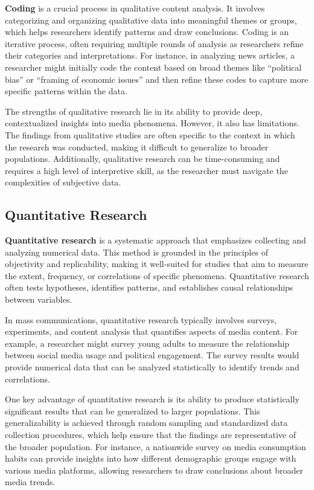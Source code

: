\documentclass[
]{book}
\begin{document}
\textbf{Coding} is a crucial process in qualitative content analysis. It involves categorizing and organizing qualitative data into meaningful themes or groups, which helps researchers identify patterns and draw conclusions. Coding is an iterative process, often requiring multiple rounds of analysis as researchers refine their categories and interpretations. For instance, in analyzing news articles, a researcher might initially code the content based on broad themes like ``political bias'' or ``framing of economic issues'' and then refine these codes to capture more specific patterns within the data.

The strengths of qualitative research lie in its ability to provide deep, contextualized insights into media phenomena. However, it also has limitations. The findings from qualitative studies are often specific to the context in which the research was conducted, making it difficult to generalize to broader populations. Additionally, qualitative research can be time-consuming and requires a high level of interpretive skill, as the researcher must navigate the complexities of subjective data.

\subsection*{Quantitative Research}\label{quantitative-research}

\textbf{Quantitative research} is a systematic approach that emphasizes collecting and analyzing numerical data. This method is grounded in the principles of objectivity and replicability, making it well-suited for studies that aim to measure the extent, frequency, or correlations of specific phenomena. Quantitative research often tests hypotheses, identifies patterns, and establishes causal relationships between variables.

In mass communications, quantitative research typically involves surveys, experiments, and content analysis that quantifies aspects of media content. For example, a researcher might survey young adults to measure the relationship between social media usage and political engagement. The survey results would provide numerical data that can be analyzed statistically to identify trends and correlations.

One key advantage of quantitative research is its ability to produce statistically significant results that can be generalized to larger populations. This generalizability is achieved through random sampling and standardized data collection procedures, which help ensure that the findings are representative of the broader population. For instance, a nationwide survey on media consumption habits can provide insights into how different demographic groups engage with various media platforms, allowing researchers to draw conclusions about broader media trends.
\end{document}
